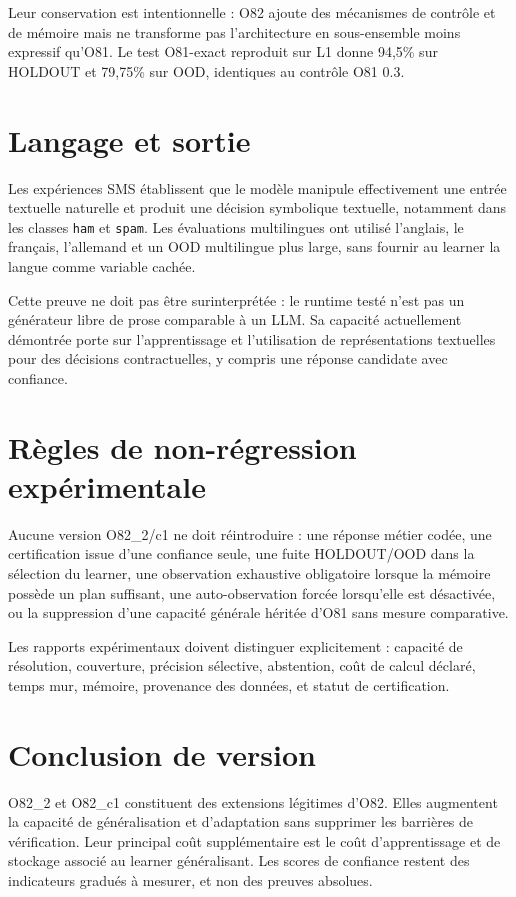 \documentclass[11pt,a4paper]{report}
\begin{document}
Leur conservation est intentionnelle : O82 ajoute des mécanismes de contrôle et de mémoire mais ne transforme pas l'architecture en sous-ensemble moins expressif qu'O81. Le test O81-exact reproduit sur L1 donne 94,5\% sur HOLDOUT et 79,75\% sur OOD, identiques au contrôle O81 0.3.

\section{Langage et sortie}
Les expériences SMS établissent que le modèle manipule effectivement une entrée textuelle naturelle et produit une décision symbolique textuelle, notamment dans les classes \texttt{ham} et \texttt{spam}. Les évaluations multilingues ont utilisé l'anglais, le français, l'allemand et un OOD multilingue plus large, sans fournir au learner la langue comme variable cachée.

Cette preuve ne doit pas être surinterprétée : le runtime testé n'est pas un générateur libre de prose comparable à un LLM. Sa capacité actuellement démontrée porte sur l'apprentissage et l'utilisation de représentations textuelles pour des décisions contractuelles, y compris une réponse candidate avec confiance.

\section{Règles de non-régression expérimentale}
Aucune version O82\_2/c1 ne doit réintroduire : une réponse métier codée, une certification issue d'une confiance seule, une fuite HOLDOUT/OOD dans la sélection du learner, une observation exhaustive obligatoire lorsque la mémoire possède un plan suffisant, une auto-observation forcée lorsqu'elle est désactivée, ou la suppression d'une capacité générale héritée d'O81 sans mesure comparative.

Les rapports expérimentaux doivent distinguer explicitement : capacité de résolution, couverture, précision sélective, abstention, coût de calcul déclaré, temps mur, mémoire, provenance des données, et statut de certification.

\section{Conclusion de version}
O82\_2 et O82\_c1 constituent des extensions légitimes d'O82. Elles augmentent la capacité de généralisation et d'adaptation sans supprimer les barrières de vérification. Leur principal coût supplémentaire est le coût d'apprentissage et de stockage associé au learner généralisant. Les scores de confiance restent des indicateurs gradués à mesurer, et non des preuves absolues.
\end{document}
